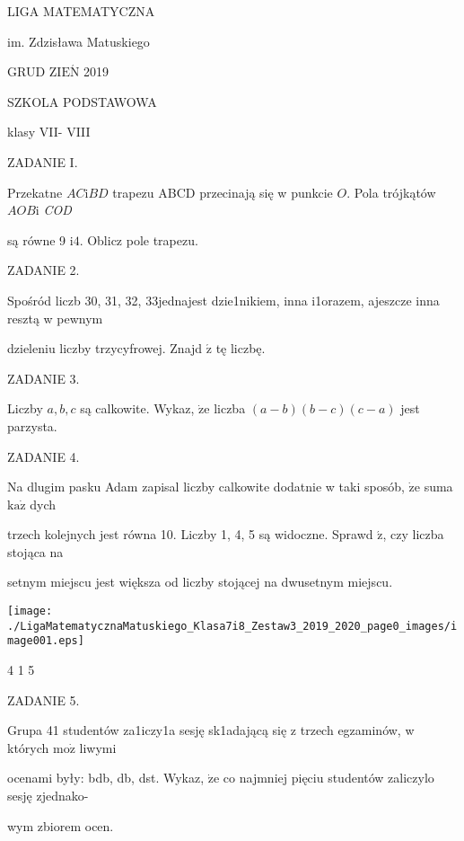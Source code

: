 \documentclass[a4paper,12pt]{article}
\begin{document}
LIGA MATEMATYCZNA

im. Zdzisława Matuskiego

GRUD Z$\mathrm{I}\mathrm{E}\acute{\mathrm{N}}$ 2019

SZKOLA PODSTAWOWA

klasy VII- VIII

ZADANIE I.

Przekatne $AC\mathrm{i}BD$ trapezu ABCD przecinają się w punkcie $O$. Pola trójkątów $AOB\mathrm{i}$ {\it COD}

są równe 9 $\mathrm{i}4$. Oblicz pole trapezu.

ZADANIE 2.

Spośród liczb 30, 31, 32, 33jednajest dzie1nikiem, inna i1orazem, ajeszcze inna resztą w pewnym

dzieleniu liczby trzycyfrowej. Znajd $\acute{\mathrm{z}}$ tę liczbę.

ZADANIE 3.

Liczby $a, b, c$ są calkowite. Wykaz, $\dot{\mathrm{z}}\mathrm{e}$ liczba $(a-b)(b-c)(c-a)$ jest parzysta.

ZADANIE 4.

Na dlugim pasku Adam zapisal liczby calkowite dodatnie w taki sposób, $\dot{\mathrm{z}}\mathrm{e}$ suma $\mathrm{k}\mathrm{a}\dot{\mathrm{z}}$ dych

trzech kolejnych jest równa 10. Liczby 1, 4, 5 są widoczne. Sprawd $\acute{\mathrm{z}}$, czy liczba stojąca na

setnym miejscu jest większa od liczby stojącej na dwusetnym miejscu.
\begin{center}
\texttt{[image: ./LigaMatematycznaMatuskiego\_Klasa7i8\_Zestaw3\_2019\_2020\_page0\_images/image001.eps]}
\end{center}
4 1  5

ZADANIE 5.

Grupa 41 studentów za1iczy1a sesję sk1adającą się z trzech egzaminów, w których $\mathrm{m}\mathrm{o}\dot{\mathrm{z}}$ liwymi

ocenami były: bdb, db, dst. Wykaz, $\dot{\mathrm{z}}\mathrm{e}$ co najmniej pięciu studentów zaliczylo sesję zjednako-

wym zbiorem ocen.
\end{document}
